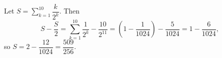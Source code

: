 Let $S=\displaystyle\sum_{k=1}^{10}\dfrac{k}{2^k}$. Then
\[S-\dfrac S2=\sum_{k=1}^{10}\dfrac{1}{2^k}-\dfrac{10}{2^{11}}=\left(1-\dfrac{1}{1024}\right)-\dfrac{5}{1024}=1-\dfrac{6}{1024},\]
so $S=2-\dfrac{12}{1024}=\boxed{\dfrac{509}{256}}$.

